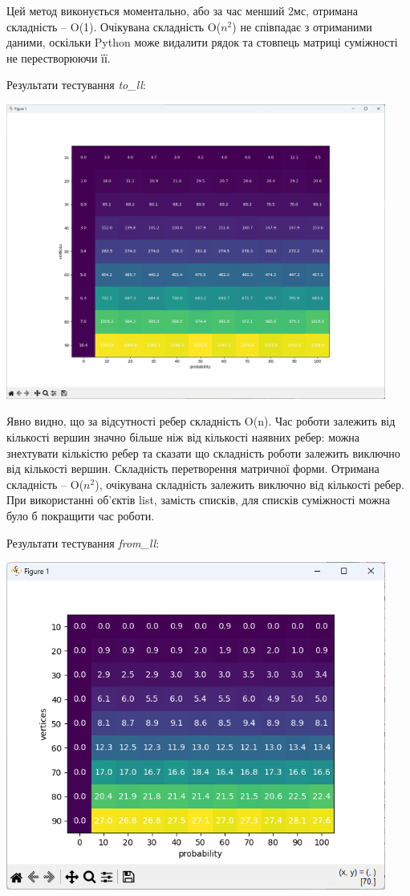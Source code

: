 \documentclass{article}
\begin{document}
Цей метод виконується моментально, або за час менший 2мс, отримана складність -- O(1). Очікувана складність O($n^2$) не співпадає з отриманими даними, оскільки Python може видалити рядок та стовпець матриці суміжності не перестворюючи її.
\newpage

Результати тестування \textit{to\_ll}:
\begin{center}
    \includegraphics[width=125mm]{toll}
\end{center}\indent

Явно видно, що за відсутності ребер складність O(n). Час роботи залежить від кількості вершин значно більше ніж від кількості наявних ребер: можна знехтувати кількістю ребер та сказати що складність роботи залежить виключно від кількості вершин. Складність перетворення матричної форми. Отримана складність -- O($n^2$), очікувана складність залежить виключно від кількості ребер. При використанні об'єктів list, замість списків, для списків суміжності можна було б покращити час роботи.
\newpage

Результати тестування \textit{from\_ll}:
\begin{center}
    \includegraphics[width=125mm]{fromll}
\end{center}\indent
\end{document}

